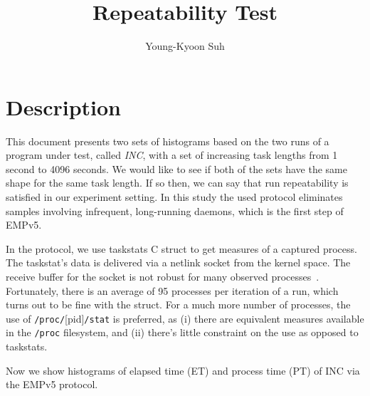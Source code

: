 \documentclass[10pt]{article}
\begin{document}
\title{Repeatability Test}

\author{
Young-Kyoon Suh\\
}
\maketitle

\section{Description}
This document presents two sets of histograms based on the two runs 
of a program under test, called {\em INC}, with a set of increasing task lengths 
from 1 second to 4096 seconds.
We would like to see if both of the sets have the same shape for the same task length.
If so then, we can say that run repeatability is satisfied in our experiment setting. 
In this study the used protocol eliminates samples involving infrequent, long-running daemons, 
which is the first step of EMPv5.

In the protocol, we use taskstats C struct to get measures of a captured process. 
The taskstat's data is delivered via a netlink socket from the kernel space. 
The receive buffer for the socket is not robust for many observed processes~\cite{Metrology}. 
Fortunately, there is an average of 95 processes per iteration of a run, 
which turns out to be fine with the struct. 
For a much more number of processes, 
the use of  {\tt /proc/}[pid]{\tt{/stat}} is preferred, 
as (i) there are equivalent measures available in the {\tt /proc} filesystem, 
and (ii) there's little constraint on the use as opposed to taskstats. 

Now we show histograms of elapsed time (ET) and process time (PT) of INC via the EMPv5 protocol.

\pagebreak



\pagebreak
\newpage



\pagebreak
\newpage



%
%

\pagebreak
\newpage



\pagebreak
\newpage
\end{document}
